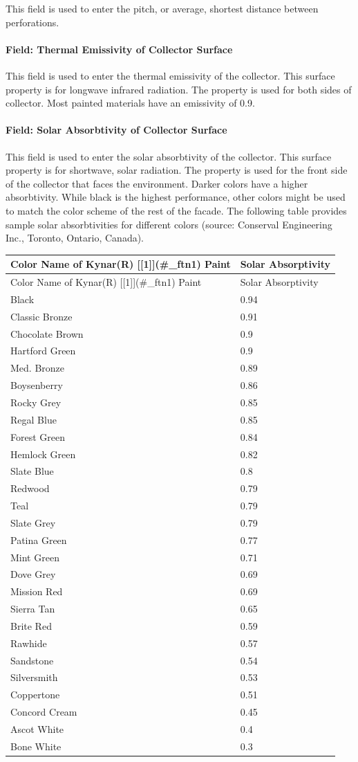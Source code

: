 This field is used to enter the pitch, or average, shortest distance between perforations.

\paragraph{Field: Thermal Emissivity of Collector Surface}\label{field-thermal-emissivity-of-collector-surface}

This field is used to enter the thermal emissivity of the collector. This surface property is for longwave infrared radiation. The property is used for both sides of collector. Most painted materials have an emissivity of 0.9.

\paragraph{Field: Solar Absorbtivity of Collector Surface}\label{field-solar-absorbtivity-of-collector-surface}

This field is used to enter the solar absorbtivity of the collector. This surface property is for shortwave, solar radiation. The property is used for the front side of the collector that faces the environment. Darker colors have a higher absorbtivity. While black is the highest performance, other colors might be used to match the color scheme of the rest of the facade. The following table provides sample solar absorbtivities for different colors (source: Conserval Engineering Inc., Toronto, Ontario, Canada).

\begin{longtable}[c]{@{}ll@{}}
\toprule
Color Name of Kynar(R) [[1]](\#\_ftn1) Paint & Solar Absorptivity \tabularnewline
\midrule
\endfirsthead

\toprule
Color Name of Kynar(R) [[1]](\#\_ftn1) Paint & Solar Absorptivity \tabularnewline
\midrule
\endhead

Black & 0.94 \tabularnewline
Classic Bronze & 0.91 \tabularnewline
Chocolate Brown & 0.9 \tabularnewline
Hartford Green & 0.9 \tabularnewline
Med. Bronze & 0.89 \tabularnewline
Boysenberry & 0.86 \tabularnewline
Rocky Grey & 0.85 \tabularnewline
Regal Blue & 0.85 \tabularnewline
Forest Green & 0.84 \tabularnewline
Hemlock Green & 0.82 \tabularnewline
Slate Blue & 0.8 \tabularnewline
Redwood & 0.79 \tabularnewline
Teal & 0.79 \tabularnewline
Slate Grey & 0.79 \tabularnewline
Patina Green & 0.77 \tabularnewline
Mint Green & 0.71 \tabularnewline
Dove Grey & 0.69 \tabularnewline
Mission Red & 0.69 \tabularnewline
Sierra Tan & 0.65 \tabularnewline
Brite Red & 0.59 \tabularnewline
Rawhide & 0.57 \tabularnewline
Sandstone & 0.54 \tabularnewline
Silversmith & 0.53 \tabularnewline
Coppertone & 0.51 \tabularnewline
Concord Cream & 0.45 \tabularnewline
Ascot White & 0.4 \tabularnewline
Bone White & 0.3 \tabularnewline
\bottomrule
\end{longtable}

